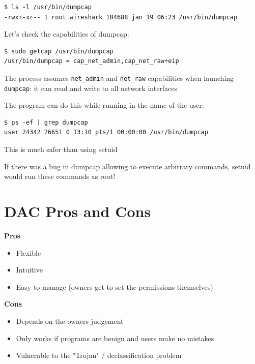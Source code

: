 \documentclass[11pt]{article}
\begin{document}
\begin{lstlisting}[style=terminal]
$ ls -l /usr/bin/dumpcap
-rwxr-xr-- 1 root wireshark 104688 jan 19 06:23 /usr/bin/dumpcap

\end{lstlisting}
Let's check the capabilities of dumpcap: 

\begin{lstlisting}[style=terminal]
$ sudo getcap /usr/bin/dumpcap
/usr/bin/dumpcap = cap_net_admin,cap_net_raw+eip
\end{lstlisting}

The process assumes \verb|net_admin| and \verb|net_raw| capabilities when launching \verb|dumpcap|: it can read and write to all network interfaces

The program can do this while running in the name of the user:

\begin{lstlisting}[style=terminal]
$ ps -ef | grep dumpcap
user 24342 26651 0 13:10 pts/1 00:00:00 /usr/bin/dumpcap
\end{lstlisting}
This is much safer than using setuid

If there was a bug in dumpcap allowing to execute arbitrary commands, setuid would run these commands as root!


\section*{DAC Pros and Cons}

\begin{minipage}{0.5\textwidth}
\textbf{Pros}
\begin{itemize}
	\item Flexible
	\item Intuitive
	\item Easy to manage (owners get to set the permissions themselves)
\end{itemize}
\end{minipage}
\begin{minipage}{0.5\textwidth}
\textbf{Cons}
\begin{itemize}
	\item Depends on the owners judgement
	\item Only works if programs are benign and users make no mistakes
	\item Vulnerable to the "Trojan" / declassification problem
\end{itemize}
\end{minipage}
\end{document}
